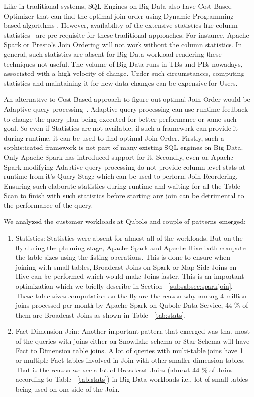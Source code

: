 \documentclass[conference]{IEEEtran}
\begin{document}
Like in traditional systems, SQL Engines on Big Data also have Cost-Based Optimizer that can find the optimal join order using Dynamic Programming based algorithms \cite{b1}. However, availability of the extensive statistics like column statistics~\cite{b11} are pre-requisite for these traditional approaches. For instance, Apache Spark or Presto's Join Ordering will not work without the column statistics. In general, such statistics are absent for Big Data workload rendering these techniques not useful. The volume of Big Data runs in TBs and PBs nowadays, associated with a high velocity of change. Under such circumstances, computing statistics and maintaining it for new data changes can be expensive for Users.

An alternative to Cost Based approach to figure out optimal Join Order would be Adaptive query processing~\cite{b12}. Adaptive query processing can use runtime feedback to change the query plan being executed for better performance or some such goal. So even if Statistics are not available, if such a framework can provide it during runtime, it can be used to find optimal Join Order.
Firstly, such a sophisticated framework is not part of many existing SQL engines on Big Data. Only Apache Spark has introduced support for it.  Secondly,
even on Apache Spark modifying Adaptive query processing do not provide column level stats at runtime from it's Query Stage which can be used to perform Join Reordering. Ensuring such elaborate statistics during runtime and waiting for all the Table Scan to finish with such statistics before starting any join can be detrimental to the performance of the query.

We analyzed the customer workloads at Qubole and couple of patterns emerged:
\begin{enumerate}
\item Statistics: Statistics were absent for almost all of the workloads. But on the fly during the planning stage, Apache Spark and Apache Hive both compute the table sizes using the listing operations. This is done to ensure when joining with small tables, Broadcast Joins on Spark or Map-Side Joins on Hive can be performed which would make Joins faster. This is an important optimization which we briefly describe in Section ~\ref{subsubsec:sparkjoin}. These table sizes computation on the fly are the reason why among 4 million joins processed per month by Apache Spark on Qubole Data Service, 44 \% of them are Broadcast Joins as shown in Table ~\ref{tab:stats}.
\item Fact-Dimension Join: Another important pattern that emerged was that most of the queries with joins either on Snowflake schema or Star Schema will have Fact to Dimension table joins. A lot of queries with multi-table joins have 1 or multiple Fact tables involved in Join with other smaller dimension tables. That is the reason we see a lot of Broadcast Joins (almost 44 \% of Joins according to Table ~\ref{tab:stats}) in Big Data workloads i.e., lot of small tables being used on one side of the Join.
\end{enumerate}
\end{document}
